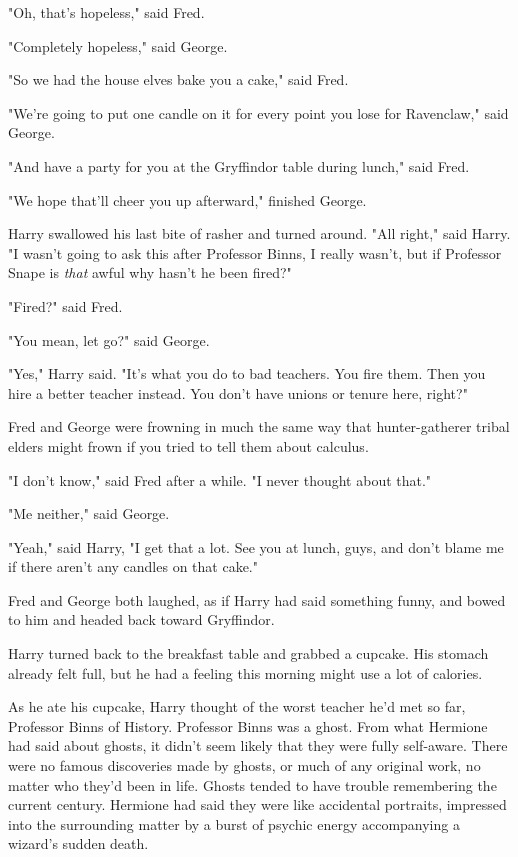 "Oh, that's hopeless," said Fred.

"Completely hopeless," said George.

"So we had the house elves bake you a cake," said Fred.

"We're going to put one candle on it for every point you lose for Ravenclaw,"
said George.

"And have a party for you at the Gryffindor table during lunch," said Fred.

"We hope that'll cheer you up afterward," finished George.

Harry swallowed his last bite of rasher and turned around. "All right," said
Harry. "I wasn't going to ask this after Professor Binns, I really wasn't, but
if Professor Snape is \emph{that} awful why hasn't he been fired?"

"Fired?" said Fred.

"You mean, let go?" said George.

"Yes," Harry said. "It's what you do to bad teachers. You fire them. Then you
hire a better teacher instead. You don't have unions or tenure here, right?"

Fred and George were frowning in much the same way that hunter-gatherer tribal
elders might frown if you tried to tell them about calculus.

"I don't know," said Fred after a while. "I never thought about that."

"Me neither," said George.

"Yeah," said Harry, "I get that a lot. See you at lunch, guys, and don't blame
me if there aren't any candles on that cake."

Fred and George both laughed, as if Harry had said something funny, and bowed
to him and headed back toward Gryffindor.

Harry turned back to the breakfast table and grabbed a cupcake. His stomach
already felt full, but he had a feeling this morning might use a lot of
calories.

As he ate his cupcake, Harry thought of the worst teacher he'd met so far,
Professor Binns of History. Professor Binns was a ghost. From what Hermione had
said about ghosts, it didn't seem likely that they were fully self-aware. There
were no famous discoveries made by ghosts, or much of any original work, no
matter who they'd been in life. Ghosts tended to have trouble remembering the
current century. Hermione had said they were like accidental portraits,
impressed into the surrounding matter by a burst of psychic energy accompanying
a wizard's sudden death.

